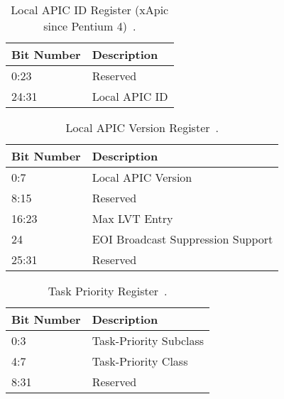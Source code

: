 \begin{table}[H]
  \centering
  \begin{tabularx}{1.0\textwidth}{| X | X |}
    \hline
    \textbf{Bit Number} & \textbf{Description} \\ \hline\hline
    0:23                & Reserved             \\ \hline
    24:31               & Local APIC ID        \\ \hline
  \end{tabularx}
  \caption{Local APIC ID Register (xApic since Pentium 4)~\autocite[sec.~3.11.4.6]{ia32}.}
  \label{tab:lapicregsid}
\end{table}

\begin{table}[H]
  \centering
  \begin{tabularx}{1.0\textwidth}{| X | X |}
    \hline
    \textbf{Bit Number} & \textbf{Description}              \\ \hline\hline
    0:7                 & Local APIC Version                \\ \hline
    8:15                & Reserved                          \\ \hline
    16:23               & Max LVT Entry                     \\ \hline
    24                  & EOI Broadcast Suppression Support \\ \hline
    25:31               & Reserved                          \\ \hline
  \end{tabularx}
  \caption{Local APIC Version Register~\autocite[sec.~3.11.4.8]{ia32}.}
  \label{tab:lapicregsver}
\end{table}

\begin{table}[H]
  \centering
  \begin{tabularx}{1.0\textwidth}{| X | X |}
    \hline
    \textbf{Bit Number} & \textbf{Description}   \\ \hline\hline
    0:3                 & Task-Priority Subclass \\ \hline
    4:7                 & Task-Priority Class    \\ \hline
    8:31                & Reserved               \\ \hline
  \end{tabularx}
  \caption{Task Priority Register~\autocite[sec.~3.11.8.3.1]{ia32}.}
  \label{tab:lapicregstpr}
\end{table}


